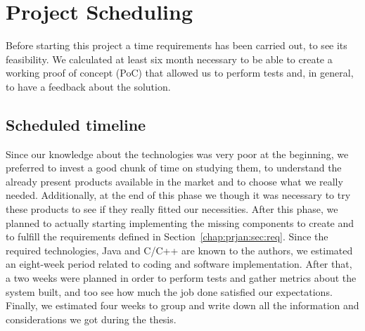 \section{Project Scheduling}
\label{chap:prjan:sec:prjsche}

Before starting this project a time requirements has been carried out, to see
its feasibility. We calculated at least six month necessary to be able to create
a working proof of concept (PoC) that allowed us to perform tests and, in
general, to have a feedback about the solution.

\subsection{Scheduled timeline}
Since our knowledge about the technologies was very poor at the beginning, we
preferred to invest a good chunk of time on studying them, to understand the already
present products available in the market and to choose what we really needed.
Additionally, at the end of this phase we though it was necessary to try these
products to see if they really fitted our necessities. After this phase, we
planned to actually starting implementing the missing components to create and
to fulfill the requirements defined in Section~\ref{chap:prjan:sec:req}. Since
the required technologies, Java and C/C++ are known to the authors, we estimated
an eight-week period related to coding and software implementation. After that,
a two weeks were planned in order to perform tests and gather metrics about the
system built, and too see how much the job done satisfied our expectations.
Finally, we estimated four weeks to group and write down all the information and
considerations we got during the thesis.

